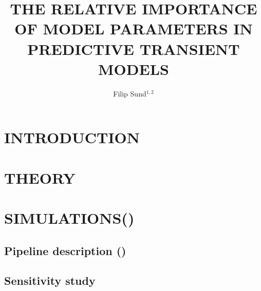 \documentclass{mekit17}
\title{THE RELATIVE IMPORTANCE OF MODEL PARAMETERS IN PREDICTIVE TRANSIENT MODELS}
\author{Filip Sund$^{1,2}$}
\begin{document}



\section{INTRODUCTION}


\section{THEORY}
\label{theory}


\section{SIMULATIONS()}
\label{simulations}
\subsection{Pipeline description ()}
\label{subsec:pipeline}

\subsection{Sensitivity study}


\end{document}
